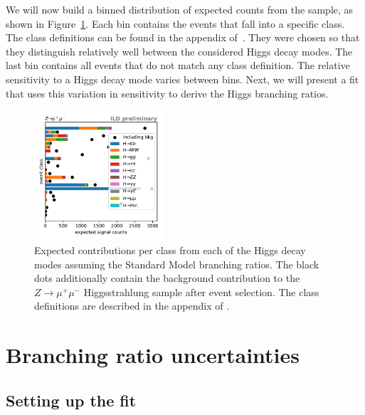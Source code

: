 \documentclass[a4paper,11pt]{article}
\begin{document}
We will now build a binned distribution of expected counts from the sample,
as shown in Figure~\ref{fig:box_counts}.
Each bin contains the events that fall into a specific class.
The class definitions can be found in the appendix of~\cite{LCWS_combined_Higgs}.
They were chosen so that they distinguish
relatively well between the considered Higgs decay modes.
The last bin contains all events that do not match any class definition.
The relative sensitivity to a Higgs decay mode varies between bins.
Next, we will present a fit that uses this variation in sensitivity
to derive the Higgs branching ratios.

\begin{figure}[ht]
    \centering
    \includegraphics[width=0.43\textwidth, keepaspectratio]{intro_category_counts_w_bkg}
    \caption{
        Expected contributions per class from each of the Higgs decay modes
        assuming the Standard Model branching ratios.
        The black dots additionally contain the background contribution
        to the $Z \to \mu^+\mu^-$ Higgsstrahlung sample after event selection.
        The class definitions are described in the appendix of \cite{LCWS_combined_Higgs}.
    }\label{fig:box_counts}
\end{figure}

\section{Branching ratio uncertainties}\label{sec:fit}

\subsection{Setting up the fit}
\end{document}
